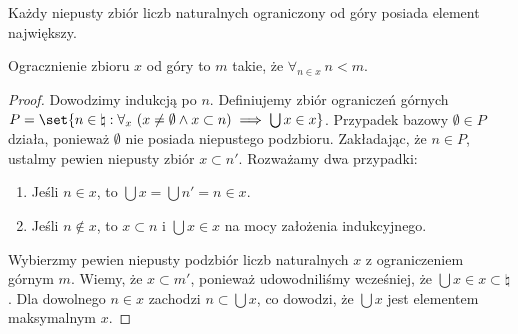 \begin{theorem}
    Każdy niepusty zbiór liczb naturalnych ograniczony od góry posiada element największy.
\end{theorem}
Ogracznienie zbioru \( x \) od góry to \( m \) takie, że \( \forall_{n \in x} \ n < m \).
\begin{proof}
    Dowodzimy indukcją po \( n \). Definiujemy zbiór ograniczeń górnych \( P = \set{n \in \natural : \forall_x \ (x \ne \emptyset \land x \subset n) \implies \bigcup x \in x} \).
    Przypadek bazowy \( \emptyset \in P \) działa, ponieważ \( \emptyset \) nie posiada niepustego podzbioru. Zakładając, że \( n \in P \), ustalmy pewien niepusty zbiór \( x \subset n' \). Rozważamy dwa przypadki:
    \begin{enumerate}
        \item Jeśli \( n \in x \), to \( \bigcup x = \bigcup n' = n \in x \).
        \item Jeśli \( n \notin x \), to \( x \subset n \) i \( \bigcup x \in x \) na mocy założenia indukcyjnego.
    \end{enumerate}
    Wybierzmy pewien niepusty podzbiór liczb naturalnych \( x \) z ograniczeniem górnym \( m \). Wiemy, że \( x \subset m' \), ponieważ udowodniliśmy wcześniej, że \( \bigcup x \in x \subset \natural \).
    Dla dowolnego \( n \in x \) zachodzi \( n \subset \bigcup x \), co dowodzi, że \( \bigcup x \) jest elementem maksymalnym \( x \).
\end{proof}